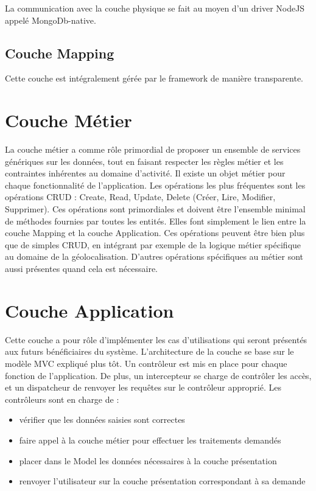 \documentclass[a4paper,12pt]{report}
\begin{document}
\begin{onehalfspace}
  La communication avec la couche physique se fait au moyen d’un driver NodeJS appelé MongoDb-native.

\subsection{Couche Mapping}
Cette couche est intégralement gérée par le framework de manière transparente.

\section{Couche Métier}
  La couche métier a comme rôle primordial de proposer un ensemble de services génériques sur les données, tout en faisant respecter les règles métier et les contraintes inhérentes au domaine d’activité.
  Il existe un objet métier pour chaque fonctionnalité de l’application. Les opérations les plus fréquentes sont les opérations CRUD : Create, Read, Update, Delete (Créer, Lire, Modifier, Supprimer). Ces opérations sont primordiales et doivent être l’ensemble minimal de méthodes fournies par toutes les entités. Elles font simplement le lien entre la couche Mapping et la couche Application.
  Ces opérations peuvent être bien plus que de simples CRUD, en intégrant par exemple de la logique métier spécifique au domaine de la géolocalisation. D’autres opérations spécifiques au métier sont aussi présentes quand cela est nécessaire.

\section{Couche Application}
Cette couche a pour rôle d’implémenter les cas d’utilisations qui seront présentés aux futurs bénéficiaires du système. L’architecture de la couche se base sur le modèle MVC expliqué plus tôt. Un contrôleur est mis en place pour chaque fonction de l’application. De plus, un intercepteur se charge de contrôler les accès, et un dispatcheur de renvoyer les requêtes sur le contrôleur approprié. Les contrôleurs sont en charge de :
\begin{itemize}
  \item vérifier que les données saisies sont correctes
  \item faire appel à la couche métier pour effectuer les traitements demandés
  \item placer dans le Model les données nécessaires à la couche présentation
  \item renvoyer l’utilisateur sur la couche présentation correspondant à sa demande
\end{itemize}


\end{onehalfspace}
\end{document}
